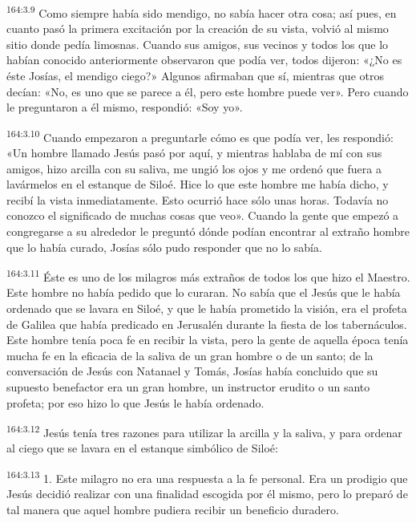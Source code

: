 \par 
\textsuperscript{164:3.9} Como siempre había sido mendigo, no sabía hacer otra cosa; así pues, en cuanto pasó la primera excitación por la creación de su vista, volvió al mismo sitio donde pedía limosnas. Cuando sus amigos, sus vecinos y todos los que lo habían conocido anteriormente observaron que podía ver, todos dijeron: «¿No es éste Josías, el mendigo ciego?» Algunos afirmaban que sí, mientras que otros decían: «No, es uno que se parece a él, pero este hombre puede ver». Pero cuando le preguntaron a él mismo, respondió: «Soy yo».

\par 
\textsuperscript{164:3.10} Cuando empezaron a preguntarle cómo es que podía ver, les respondió: «Un hombre llamado Jesús pasó por aquí, y mientras hablaba de mí con sus amigos, hizo arcilla con su saliva, me ungió los ojos y me ordenó que fuera a lavármelos en el estanque de Siloé. Hice lo que este hombre me había dicho, y recibí la vista inmediatamente. Esto ocurrió hace sólo unas horas. Todavía no conozco el significado de muchas cosas que veo». Cuando la gente que empezó a congregarse a su alrededor le preguntó dónde podían encontrar al extraño hombre que lo había curado, Josías sólo pudo responder que no lo sabía.

\par 
\textsuperscript{164:3.11} Éste es uno de los milagros más extraños de todos los que hizo el Maestro. Este hombre no había pedido que lo curaran. No sabía que el Jesús que le había ordenado que se lavara en Siloé, y que le había prometido la visión, era el profeta de Galilea que había predicado en Jerusalén durante la fiesta de los tabernáculos. Este hombre tenía poca fe en recibir la vista, pero la gente de aquella época tenía mucha fe en la eficacia de la saliva de un gran hombre o de un santo; de la conversación de Jesús con Natanael y Tomás, Josías había concluido que su supuesto benefactor era un gran hombre, un instructor erudito o un santo profeta; por eso hizo lo que Jesús le había ordenado.

\par 
\textsuperscript{164:3.12} Jesús tenía tres razones para utilizar la arcilla y la saliva, y para ordenar al ciego que se lavara en el estanque simbólico de Siloé:

\par 
\textsuperscript{164:3.13} 1. Este milagro no era una respuesta a la fe personal. Era un prodigio que Jesús decidió realizar con una finalidad escogida por él mismo, pero lo preparó de tal manera que aquel hombre pudiera recibir un beneficio duradero.

